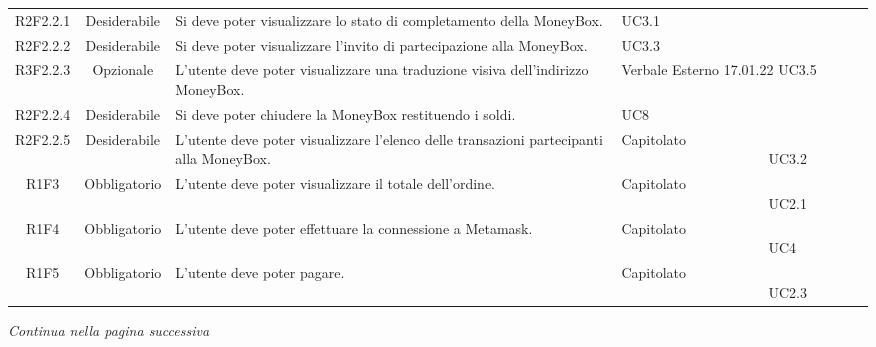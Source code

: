 \begin{table}[H]
\begin{tabular}{c | c | p{6cm} | p{4.1cm}}
        R2F2.2.1                                                          & Desiderabile & Si deve poter visualizzare lo stato di completamento della MoneyBox\glo{}.                       & UC3.1                             \\
        R2F2.2.2                                                          & Desiderabile & Si deve poter visualizzare l'invito di partecipazione alla MoneyBox\glo{}.                       & UC3.3                             \\
        R3F2.2.3                                                          & Opzionale    & L'utente deve poter visualizzare una traduzione visiva dell'indirizzo MoneyBox\glo{}.            & Verbale Esterno 17.01.22 UC3.5    \\
        R2F2.2.4                                                          & Desiderabile & Si deve poter chiudere la MoneyBox\glo{} restituendo i soldi.                                    & UC8                               \\
        R2F2.2.5                                                          & Desiderabile & L'utente deve poter visualizzare l'elenco delle transazioni partecipanti alla MoneyBox\glo{}.    & Capitolato \ \ \ \ \ \ \ \ \ \ \ \ \ \ \ \ \ \ \ \ \ UC3.2    \\
        R1F3                                                              & Obbligatorio & L'utente deve poter visualizzare il totale dell'ordine.                                          & Capitolato \ \ \ \ \ \ \ \ \ \ \ \ \ \ \ \ \ \ \ \ \ UC2.1    \\
        R1F4                                                              & Obbligatorio & L'utente deve poter effettuare la connessione a Metamask\glo{}.                                  & Capitolato \ \ \ \ \ \ \ \ \ \ \ \ \ \ \ \ \ \ \ \ \ UC4      \\
        R1F5                                                              & Obbligatorio & L'utente deve poter pagare.                                                                      & Capitolato \ \ \ \ \ \ \ \ \ \ \ \ \ \ \ \ \ \ \ \ \ UC2.3    \\
    \end{tabular}
\end{table}
\begin{center}
    \textit{\small Continua nella pagina successiva}
\end{center}
